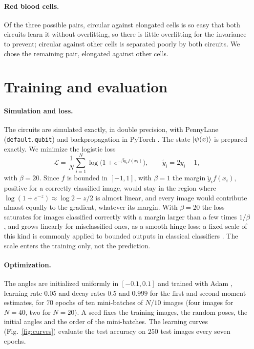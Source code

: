 \documentclass[aps,pra,reprint,superscriptaddress,longbibliography]{revtex4-2}
\newcommand{\GG}[1]{{\color{blue} \textbf{[[#1]]}}}
\begin{document}
\paragraph{Red blood cells.} Of the three possible pairs, circular against elongated cells is so easy that both circuits learn it without overfitting, so there is little overfitting for the invariance to prevent; circular against other cells is separated poorly by both circuits. We chose the remaining pair, elongated against other cells.

\section{Training and evaluation}\label{app:training}\label{app:scaling}

\paragraph{Simulation and loss.} The circuits are simulated exactly, in double precision, with PennyLane (\texttt{default.qubit}) and backpropagation in PyTorch \citep{bergholm2018pennylane,paszke2019pytorch}. The state $\ket{\psi(x)}$ is prepared exactly. We minimize the logistic loss
\begin{equation}
\mathcal{L}=\frac1N\sum_{i=1}^N\log\bigl(1+e^{-\beta \tilde y_i f(x_i)}\bigr),\qquad \tilde y_i=2y_i-1,
\label{eq:loss}
\end{equation}
with $\beta=20$.
Since $f$ is bounded in $[-1,1]$, with $\beta=1$ the margin $\tilde y_if(x_i)$, positive for a correctly classified image, would stay in the region where $\log(1+e^{-z})\approx\log 2-z/2$ is almost linear, and every image would contribute almost equally to the gradient, whatever its margin. With $\beta=20$ the loss saturates for images classified correctly with a margin larger than a few times $1/\beta$, and grows linearly for misclassified ones, as a smooth hinge loss; a fixed scale of this kind is commonly applied to bounded outputs in classical classifiers \citep{wang2017normface}. The scale enters the training only, not the prediction.

\paragraph{Optimization.} The angles are initialized uniformly in $[-0.1,0.1]$ and trained with Adam \citep{kingma2015adam}, 
learning rate $0.05$ and decay rates $0.5$ and $0.999$ for the first and second moment estimates, for $70$ epochs of ten mini-batches of $N/10$ images (four images for $N=40$, two for $N=20$). A seed fixes the training images, the random poses, the initial angles and the order of the mini-batches. The learning curves (Fig.~\ref{fig:curves}) evaluate the test accuracy on $250$ test images every seven epochs.
\end{document}
